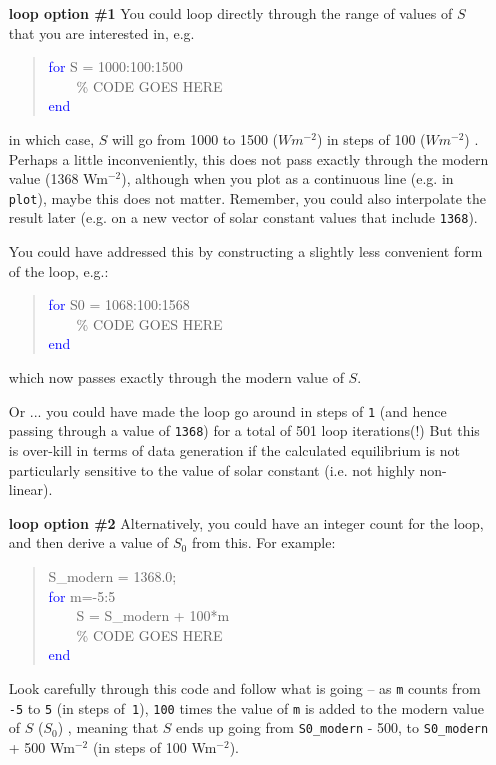 \documentclass{tufte-book} %
\newenvironment{docspec}{\begin{quotation}\ttfamily\parskip0pt\parindent0pt\ignorespaces}{\end{quotation}}
\begin{document}
\begin{enumerate}
\setlength{\itemindent}{.65in}

\item [\textbf{loop option \#1}] You could loop directly through the range of values of \(S\) that you are interested in, e.g.
\begin{docspec}
\textcolor{blue}{for} S = 1000:100:1500
\\ \ \ \ \ \textcolor[rgb]{0,0.501961,0}{\% CODE GOES HERE}
\\\textcolor{blue}{end}
\end{docspec}
in which case, \(S\) will go from 1000 to 1500 (\(Wm^{-2}\)) in steps of 100 (\(Wm^{-2}\)) .
\\Perhaps a little inconveniently, this does not pass exactly through the modern value (1368 Wm\(^{-2}\)), although when you plot as a continuous line (e.g. in \texttt{plot}),  maybe this does not matter.  Remember, you could also interpolate the result later (e.g. on a new vector of solar constant values that include \texttt{1368}).

You could have addressed this by constructing a slightly less convenient form of the loop, e.g.:
\begin{docspec}
\textcolor{blue}{for} S0 = 1068:100:1568
\\ \ \ \ \ \textcolor[rgb]{0,0.501961,0}{\% CODE GOES HERE}
\\\textcolor{blue}{end}
\end{docspec}
which now passes exactly through the modern value of \(S\).

Or ... you could have made the loop go around in steps of \texttt{1} (and hence passing through a value of \texttt{1368}) for a total of 501 loop iterations(!) But this is over-kill in terms of data generation if the calculated equilibrium is  not  particularly sensitive to the value of solar constant (i.e. not highly non-linear).

\item [\textbf{loop option \#2}] Alternatively, you could have an integer count for the loop, and then derive a  value of \(S_{0}\) from this. For example:
\begin{docspec}
S\_modern = 1368.0;
\\\textcolor{blue}{for} m=-5:5
\\ \ \ \ \ S = S\_modern + 100*m
\\ \ \ \ \ \textcolor[rgb]{0,0.501961,0}{\% CODE GOES HERE}
\\\textcolor{blue}{end}
\end{docspec}
Look carefully through this code and follow what is going -- as \texttt{m} counts from \texttt{-5} to \texttt{5} (in steps of\texttt{ 1}), \texttt{100} times the value of \texttt{m} is added to the modern value of \(S\) (\(S_{0}\)) , meaning that \(S\) ends up going from \texttt{S0\_modern} - 500, to \texttt{S0\_modern} + 500 Wm\(^{-2}\) (in steps of 100 Wm\(^{-2}\)).


\end{enumerate}
\end{document}
